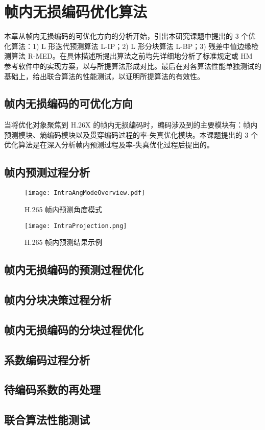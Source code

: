 \chapter{帧内无损编码优化算法}
\label{cha:c3}
本章从帧内无损编码的可优化方向的分析开始，引出本研究课题中提出的 3 个优化算法：1) L 形迭代预测算法 L-IP；2) L 形分块算法 L-BP；3) 残差中值边缘检测算法 R-MED。在具体描述所提出算法之前均先详细地分析了标准规定或 HM 参考软件中的实现方案，以与所提算法形成对比。最后在对各算法性能单独测试的基础上，给出联合算法的性能测试，以证明所提算法的有效性。

\section{帧内无损编码的可优化方向}
当将优化对象聚焦到 H.26X 的帧内无损编码时，编码涉及到的主要模块有：帧内预测模块、熵编码模块以及贯穿编码过程的率-失真优化模块。本课题提出的 3 个优化算法是在深入分析帧内预测过程及率-失真优化过程后提出的。

\section{帧内预测过程分析}
\label{cha:IntraPredDetail}

\begin{figure}[hbt]
    \centering
    \texttt{[image: IntraAngModeOverview.pdf]}
    \caption{H.265 帧内预测角度模式}
    \label{fig:IntraAngModeOverview}
\end{figure}

\begin{figure}[hbt]
    \centering
    \texttt{[image: IntraProjection.png]}
    \caption{H.265 帧内预测结果示例}
    \label{fig:IntraProjection}
\end{figure}

\section{帧内无损编码的预测过程优化}

\section{帧内分块决策过程分析}

\section{帧内无损编码的分块过程优化}

\section{系数编码过程分析}

\section{待编码系数的再处理}

\section{联合算法性能测试}